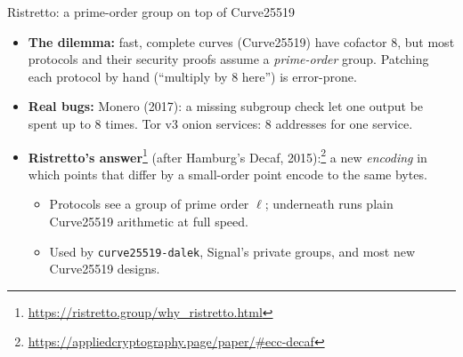 \ifdefined\PRESENTATION\else\PassOptionsToClass{handout}{beamer}\fi\documentclass[aspectratio=169, lualatex]{beamer}
\begin{document}
\begin{frame}{Ristretto: a prime-order group on top of Curve25519}
	\begin{itemize}
		\item \textbf{The dilemma:} fast, complete curves (Curve25519) have cofactor 8, but most protocols and their security proofs assume a \emph{prime-order} group. Patching each protocol by hand (``multiply by 8 here'') is error-prone.
		\item \textbf{Real bugs:} Monero (2017): a missing subgroup check let one output be spent up to 8 times. Tor v3 onion services: 8 addresses for one service.
		\item \textbf{Ristretto's answer}\footnote{\url{https://ristretto.group/why_ristretto.html}} (after Hamburg's Decaf, 2015):\footnote{\url{https://appliedcryptography.page/paper/\#ecc-decaf}} a new \emph{encoding} in which points that differ by a small-order point encode to the same bytes.
		      \begin{itemize}
			      \item Protocols see a group of prime order $\ell$; underneath runs plain Curve25519 arithmetic at full speed.
			      \item Used by \texttt{curve25519-dalek}, Signal's private groups, and most new Curve25519 designs.
		      \end{itemize}
	\end{itemize}
\end{frame}
\end{document}
